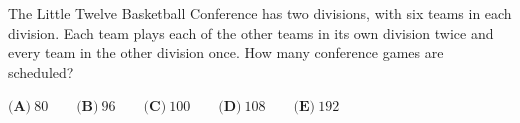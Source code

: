 The Little Twelve Basketball Conference has two divisions, with six teams in each division. Each team plays each of the other teams in its own division twice and every team in the other division once. How many conference games are scheduled?

$\textbf{(A)}\ 80\qquad\textbf{(B)}\ 96\qquad\textbf{(C)}\ 100\qquad\textbf{(D)}\ 108\qquad\textbf{(E)}\ 192$
